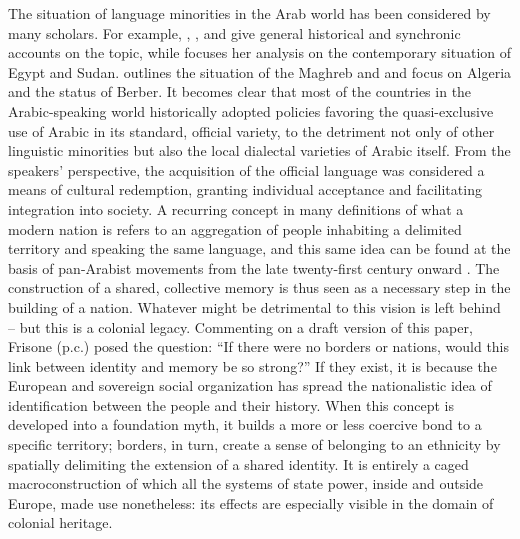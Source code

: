 \documentclass[output=paper]{langscibook}
\begin{document}
The situation of language minorities in the Arab world has been considered by many scholars. For example, \citet{zaborski_minority_1997}, \citet{owens_close_2007}, and \citet{stolz_arabic_2015} give general historical and synchronic accounts on the topic, while \citet{miller_linguistic_2003} focuses her analysis on the contemporary situation of Egypt and Sudan. \citet{grandguillaume_arabisation_1983} outlines the situation of the Maghreb and \citet{stolz_arabization_2015} and \citet{maddy-weitzman_berber_2011} focus on Algeria and the status of Berber. It becomes clear that most of the countries in the Arabic-speaking world historically adopted policies favoring the quasi-exclusive use of Arabic in its standard, official variety, to the detriment not only of other linguistic minorities but also the local dialectal varieties of Arabic itself. From the speakers’ perspective, the acquisition of the official language was considered a means of cultural redemption, granting individual acceptance and facilitating integration into society. A recurring concept in many definitions of what a modern nation is refers to an aggregation of people inhabiting a delimited territory and speaking the same language, and this same idea can be found at the basis of pan-Arabist movements from the late twenty-first century onward \citep{suleiman_language_2013}. The construction of a shared, collective memory is thus seen as a necessary step in the building of a nation. Whatever might be detrimental to this vision is left behind – but this is a colonial legacy. Commenting on a draft version of this paper, Frisone (p.c.) posed the question: “If there were no borders or nations, would this link between identity and memory be so strong?” If they exist, it is because the European and sovereign social organization has spread the nationalistic idea of identification between the people and their history. When this concept is developed into a foundation myth, it builds a more or less coercive bond to a specific territory; borders, in turn, create a sense of belonging to an ethnicity by spatially delimiting the extension of a shared identity. It is entirely a caged macroconstruction of which all the systems of state power, inside and outside Europe, made use nonetheless: its effects are especially visible in the domain of colonial heritage. 
\end{document}
